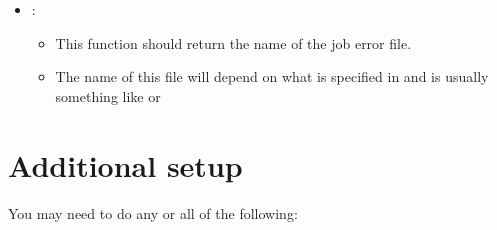 \documentclass[letterpaper,10pt,english]{sphinxmanual}
\begin{document}
\begin{itemize}
\item {} 
:
\begin{itemize}
\item {} 
This function should return the name of the job error file.

\item {} 
The name of this file will depend on what is specified in  and is usually something like  or 

\end{itemize}

\end{itemize}


\section{Additional setup}
\label{1_0_installation:id3}\label{1_0_installation:additional-setup}
You may need to do any or all of the following:
\end{document}
